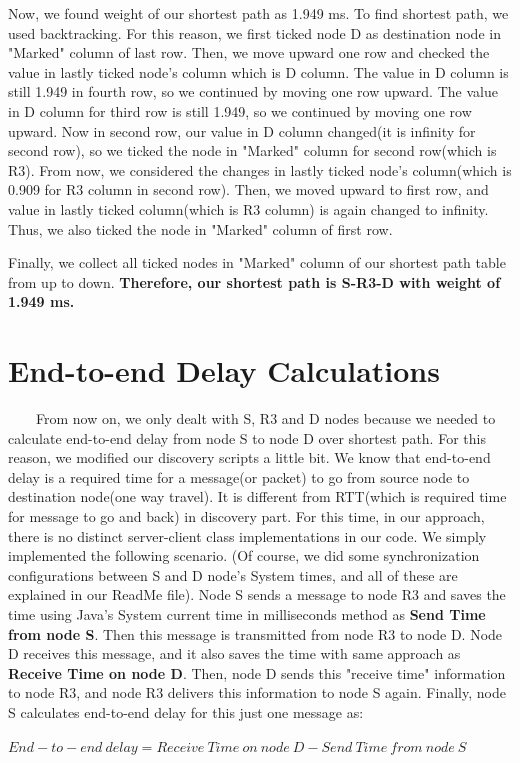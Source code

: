 \documentclass[12pt]{article}
\begin{document}
Now, we found weight of our shortest path as 1.949 ms. To find shortest path, we used backtracking. For this reason, we first ticked node D as destination node in "Marked" column of last row. Then, we move upward one row and checked the value in lastly ticked node's column which is D column. The value in D column is still 1.949 in fourth row, so we continued by moving one row upward. The value in D column for third row is still 1.949, so we continued by moving one row upward. Now in second row, our value in D column changed(it is infinity for second row), so we ticked the node in "Marked" column for second row(which is R3). From now, we considered the changes in lastly ticked node's column(which is 0.909 for R3 column in second row). Then, we moved upward to first row, and value in lastly ticked column(which is R3 column) is again changed to infinity. Thus, we also ticked the node in "Marked" column of first row.

Finally, we collect all ticked nodes in "Marked" column of our shortest path table from up to down. \textbf{Therefore, our shortest path is S-R3-D with weight of 1.949 ms.}

\section{End-to-end Delay Calculations}
\ \ \ \ From now on, we only dealt with S, R3 and D nodes because we needed to calculate end-to-end delay from node S to node D over shortest path. For this reason, we modified our discovery scripts a little bit. We know that end-to-end delay is a required time for a message(or packet) to go from source node to destination node(one way travel). It is different from RTT(which is required time for message to go and back) in discovery part. For this time, in our approach, there is no distinct server-client class implementations in our code. We simply implemented the following scenario. (Of course, we did some synchronization configurations between S and D node's System times, and all of these are explained in our ReadMe file).  Node S sends a message to node R3 and saves the time using Java's System current time in milliseconds method as \textbf{Send Time from node S}. Then this message is transmitted from node R3 to node D. Node D receives this message, and it also saves the time with same approach as \textbf{Receive Time on node D}. Then, node D sends this "receive time" information to node R3, and node R3 delivers this information to node S again. Finally, node S calculates end-to-end delay for this just one message as:
\begin{center}
$End-to-end \ delay = Receive \ Time \ on \ node \ D - Send \ Time \ from \ node \ S$
\end{center}
\end{document}
